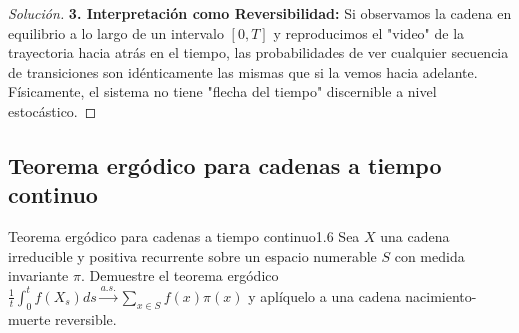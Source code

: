 \documentclass[10pt,a4paper]{article}
\begin{document}
\begin{proof}[Solución]
    \textbf{3. Interpretación como Reversibilidad:}
    Si observamos la cadena en equilibrio a lo largo de un intervalo $[0, T]$ y reproducimos el "video" de la trayectoria hacia atrás en el tiempo, las probabilidades de ver cualquier secuencia de transiciones son idénticamente las mismas que si la vemos hacia adelante. Físicamente, el sistema no tiene "flecha del tiempo" discernible a nivel estocástico.
\end{proof}

\newpage
\subsection{Teorema ergódico para cadenas a tiempo continuo}

\begin{ejercicio}{Teorema ergódico para cadenas a tiempo continuo}{1.6}
    Sea $X$ una cadena irreducible y positiva recurrente sobre un espacio numerable $S$ con medida invariante $\pi$. Demuestre el teorema ergódico $\frac{1}{t}\int_0^t f(X_s)ds \xrightarrow{a.s.} \sum_{x\in S}f(x)\pi(x)$ y aplíquelo a una cadena nacimiento-muerte reversible.
\end{ejercicio}
\end{document}

